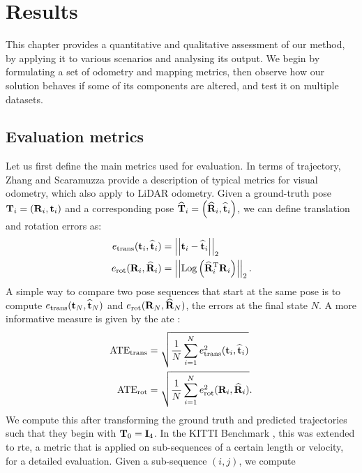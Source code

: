 \chapter{Results}
\label{ch:results}

This chapter provides a quantitative and qualitative assessment of our method, by applying it to various scenarios and analysing its output. We begin by formulating a set of odometry and mapping metrics, then observe how our solution behaves if some of its components are altered, and test it on multiple datasets.

\section{Evaluation metrics}
Let us first define the main metrics used for evaluation. In terms of trajectory, Zhang and Scaramuzza \cite{zhang2018tutorial} provide a description of typical metrics for visual odometry, which also apply to LiDAR odometry. Given a ground-truth pose
$\mathbf{T}_i = \left( \mathbf{R}_i, \mathbf{t}_i\right)$ and a corresponding pose
$\widehat{\mathbf{T}}_i = \left( \widehat{\mathbf{R}}_i, \widehat{\mathbf{t}}_i\right)$, we can define translation and rotation errors as:
\begin{equation}
    \begin{aligned}
        e_{\text{trans}}(\mathbf{t}_i, \widehat{\mathbf{t}}_i) & = \left|\left|{\mathbf{t}_i- \widehat{\mathbf{t}}_i}\right|\right|_2 \\
        e_{\text{rot}}(\mathbf{R}_i, \widehat{\mathbf{R}}_i )  & = \left|\left|{
            \text{Log}\left({{\widehat{\mathbf{R}}_i}^\text{T} \mathbf{R}_i}\right)
        }\right|\right|_2
        \text{.}
    \end{aligned}
\end{equation}
A simple way to compare two pose sequences that start at the same pose is to compute $e_{\text{trans}}(\mathbf{t}_N, \widehat{\mathbf{t}}_N)$ and $e_{\text{rot}}(\mathbf{R}_N, \widehat{\mathbf{R}}_N)$, the errors at the final state $N$. A more informative measure is given by the \acrfull{ate} \cite{kummerle2009measuring}:
\begin{equation}
    \begin{aligned}
        \text{ATE}_{\text{trans}} & = \sqrt{\frac{1}{N}\sum_{i=1}^{N} e_{\text{trans}}^2(\mathbf{t}_i, \widehat{\mathbf{t}}_i)} \\
        \text{ATE}_{\text{rot}}   & = \sqrt{\frac{1}{N}\sum_{i=1}^{N} e_{\text{rot}}^2(\mathbf{R}_i, \widehat{\mathbf{R}}_i )}
        \text{.}
    \end{aligned}
    \label{eq:ATE}
\end{equation}
We compute this after transforming the ground truth and predicted trajectories such that they begin with $\mathbf{T}_0 = \mathbf{I}_4$. In the KITTI Benchmark \cite{geiger2012kitti}, this was extended to \acrfull{rte}, a metric that is applied on sub-sequences of a certain length or velocity, for a detailed evaluation. Given a sub-sequence $(i,j)$, we compute

